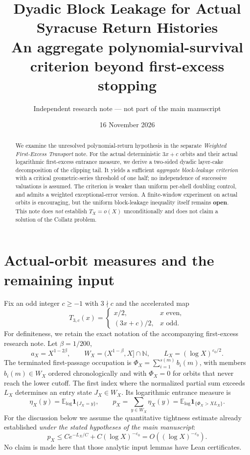 \documentclass[11pt,a4paper]{article}
\title{Dyadic Block Leakage for Actual Syracuse Return Histories\\
\large An aggregate polynomial-survival criterion beyond first-excess stopping}
\author{Independent research note --- not part of the main manuscript}
\date{16 November 2026}
\theoremstyle{remark}
\newcommand{\one}{\mathbf 1}
\begin{document}
\maketitle
\begin{abstract}
We examine the unresolved polynomial-return hypothesis in the separate
\emph{Weighted First-Excess Transport} note.  For the actual deterministic
$3x+c$ orbits and their actual logarithmic first-excess entrance measure,
we derive a two-sided dyadic layer-cake decomposition of the clipping tail.
It yields a sufficient \emph{aggregate block-leakage criterion} with a critical
geometric-series threshold of one half; no independence of successive valuations
is assumed.  The criterion is weaker than uniform per-shell doubling
control, and admits a weighted exceptional-error version.  A finite-window experiment on actual orbits is encouraging,
but the uniform block-leakage inequality itself remains \textbf{open}.
This note does \emph{not} establish $T_X=o(X)$ unconditionally and does
not claim a solution of the Collatz problem.
\end{abstract}

\section{Actual-orbit measures and the remaining input}
Fix an odd integer $c\ge-1$ with $3\nmid c$ and the accelerated map
\[
T_{3,c}(x)=\begin{cases}x/2,&x\text{ even},\\ (3x+c)/2,&x\text{ odd}.\end{cases}
\]
For definiteness, we retain the exact notation of the accompanying
first-excess research note.  Let $\beta=1/200$,
\[
a_X=X^{1-2\beta},\qquad W_X=(X^{1-\beta},X]\cap\mathbb N,\qquad
L_X=(\log X)^{\varepsilon_0/2}.
\]
The terminated first-passage occupation is
$\Phi_X=\sum_{i=1}^{s(m)}b_i(m)$, with members $b_i(m)\in W_X$
ordered chronologically and with $\Phi_X=0$ for orbits that never
reach the lower cutoff.  The first index where the normalized partial
sum exceeds $L_X$ determines an entry state $J_X\in W_X$.
Its logarithmic entrance measure is
\[
\eta_X(y)=\mathbb E_{\log}\one_{\{J_X=y\}},\qquad
p_X=\sum_{y\in W_X}\eta_X(y)
=\mathbb E_{\log}\one_{\{\Phi_X>XL_X\}}.
\]
For the discussion below we assume the quantitative tightness estimate
already established \emph{under the stated hypotheses of the main manuscript}:
\begin{equation}\label{eq:p-small}
p_X\le C e^{-L_X/C}+C(\log X)^{-\varepsilon_0}
 =O((\log X)^{-\varepsilon_0}).
\end{equation}
No claim is made here that those analytic input lemmas have Lean certificates.
\end{document}
